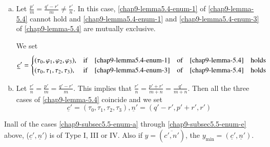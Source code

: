 \begin{enumerate}[(a)]
\item Let $\frac{p'}{m} = \frac{q'-r'}{m} \neq \frac{r'}{n}$. In this case, \eqref{chap9-lemma5.4-enum-1}
of \ref{chap9-lemma-5.4} cannot hold and \eqref{chap9-lemma5.4-enum-1} and \eqref{chap9-lemma5.4-enum-3} of \ref{chap9-lemma-5.4} are mutually exclusive.\label{chap9-subsec5.5-enum-d}

We set
\begin{align*}
\underline{c}'&=
\begin{cases}
(\tau_{0}, \varphi_{1}, \varphi_{2},\varphi_{3}), &\text{if}\quad \eqref{chap9-lemma5.4-enum-1}\quad \text{of}\quad \ref{chap9-lemma-5.4}\quad \text{holds}\\
(\tau_{0}, \tau_{1}, \tau_{2}, \tau_{3}), &\text{if}\quad \eqref{chap9-lemma5.4-enum-3}\quad \text{of}\quad \ref{chap9-lemma-5.4}\quad \text{holds}\\ 
\end{cases}
\end{align*}

\item Let $\frac{r'}{n} = \frac{p'}{m} = \frac{q'-r'}{m}$. This implies that $\frac{r'}{n} = \frac{p'+r'}{m+n} = \frac{q'}{m+n}$. Then all the three cases of \ref{chap9-lemma-5.4} coincide and we set\label{chap9-subsec5.5-enum-e}
$$
\underline{c}' = (\tau_{0}, \tau_{1}, \tau_{2}, \tau_{3}), \underline{n}' = (q'-r', p'+r',r')
$$
\end{enumerate}

\setcounter{definition}{5}
\begin{secrem}\label{chap9-remark-5.6}
In\pageoriginale all of the cases \eqref{chap9-subsec5.5-enum-a} through \eqref{chap9-subsec5.5-enum-e} above, ($\underline{c}', \underline{n}'$) is of Type I, III or IV. Also if $y = (\overline{c',n'})$, the $y_{\min} = (\underline{c}', \underline{n}')$.
\end{secrem}

\setcounter{subsection}{6}
